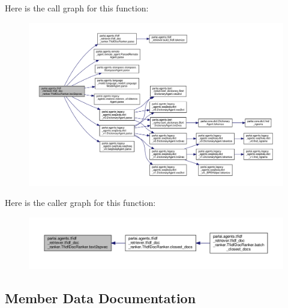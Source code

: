 Here is the call graph for this function\+:
\nopagebreak
\begin{figure}[H]
\begin{center}
\leavevmode
\includegraphics[width=350pt]{classparlai_1_1agents_1_1tfidf__retriever_1_1tfidf__doc__ranker_1_1TfidfDocRanker_ac6d8b86317616a64f5bc7f8f607dd997_cgraph}
\end{center}
\end{figure}
Here is the caller graph for this function\+:
\nopagebreak
\begin{figure}[H]
\begin{center}
\leavevmode
\includegraphics[width=350pt]{classparlai_1_1agents_1_1tfidf__retriever_1_1tfidf__doc__ranker_1_1TfidfDocRanker_ac6d8b86317616a64f5bc7f8f607dd997_icgraph}
\end{center}
\end{figure}


\subsection{Member Data Documentation}
\mbox{\label{classparlai_1_1agents_1_1tfidf__retriever_1_1tfidf__doc__ranker_1_1TfidfDocRanker_af9cda5d944e01e08c45d0b3bbe6cb1ac}} 

